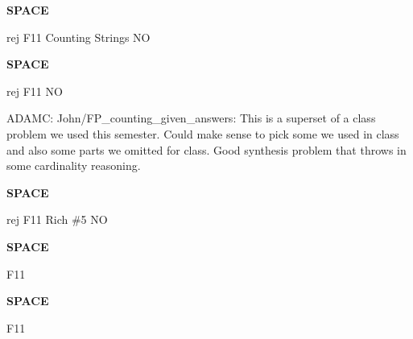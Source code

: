 \documentclass[quiz]{mcs}
\renewcommand{\examspace}{\textbf{SPACE}\newline}
\begin{document}
\examspace  
\begin{editingnotes}rej F11 Counting Strings NO \end{editingnotes}


\examspace
\begin{editingnotes}rej F11 NO

ADAMC: John/FP\_counting\_given\_answers: This is a superset of a class
problem we used this semester.  Could make sense to pick some we used
in class and also some parts we omitted for class.  Good synthesis
problem that throws in some cardinality reasoning.
\end{editingnotes}


\iffalse
\examspace
\begin{editingnotes}rej F11\end{editingnotes}
\pinput[points = 6, title = \textbf{counting fall11}]{FP_counting_fall11}
\fi

\examspace
\begin{editingnotes}rej F11 Rich \#5 NO\end{editingnotes}


\iffalse
\examspace 
\begin{editingnotes}
F11 GOOD Counting paths, part of FP\_more\_counting; S12 suggested
Keshav P

ADAMC: This is almost the same as one of our miniquiz problems.  That
might be a plus or a minus.
\end{editingnotes}

  \pinput[points = 8, title =
    \textbf{paths inclusion exclusion}]{FP_paths_inclusion_exclusion}

\examspace  %
GOOD \pinput[points = 10, title =
  \textbf{combinatorial binomial}]{FP_combinatorial_binomial}
\fi

\examspace
\begin{editingnotes}F11\end{editingnotes}


\iffalse
\examspace
\begin{editingnotes}F11\end{editingnotes}
\end{document}
